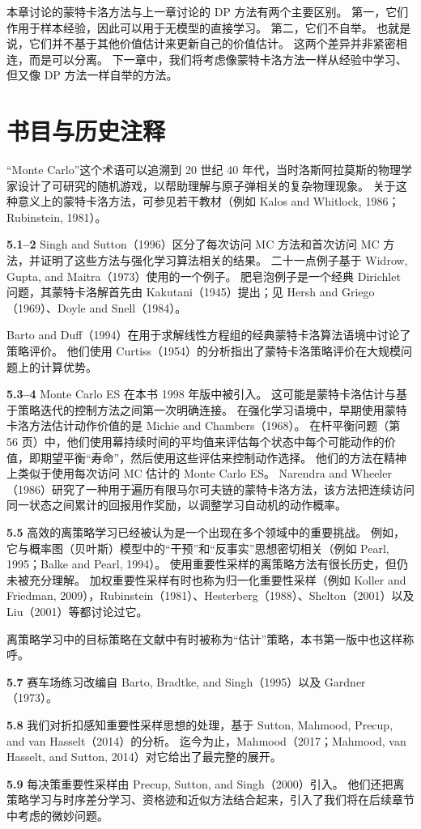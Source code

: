 \documentclass[UTF8, 12pt, fontset=fandol, oneside]{ctexart}
\begin{document}
本章讨论的蒙特卡洛方法与上一章讨论的 DP 方法有两个主要区别。
第一，它们作用于样本经验，因此可以用于无模型的直接学习。
第二，它们不自举。
也就是说，它们并不基于其他价值估计来更新自己的价值估计。
这两个差异并非紧密相连，而是可以分离。
下一章中，我们将考虑像蒙特卡洛方法一样从经验中学习、但又像 DP 方法一样自举的方法。

\section*{书目与历史注释}

“Monte Carlo”这个术语可以追溯到 20 世纪 40 年代，当时洛斯阿拉莫斯的物理学家设计了可研究的随机游戏，以帮助理解与原子弹相关的复杂物理现象。
关于这种意义上的蒙特卡洛方法，可参见若干教材（例如 Kalos and Whitlock, 1986；Rubinstein, 1981）。

\noindent\textbf{5.1--2}
Singh and Sutton（1996）区分了每次访问 MC 方法和首次访问 MC 方法，并证明了这些方法与强化学习算法相关的结果。
二十一点例子基于 Widrow, Gupta, and Maitra（1973）使用的一个例子。
肥皂泡例子是一个经典 Dirichlet 问题，其蒙特卡洛解首先由 Kakutani（1945）提出；见 Hersh and Griego（1969）、Doyle and Snell（1984）。

Barto and Duff（1994）在用于求解线性方程组的经典蒙特卡洛算法语境中讨论了策略评价。
他们使用 Curtiss（1954）的分析指出了蒙特卡洛策略评价在大规模问题上的计算优势。

\noindent\textbf{5.3--4}
Monte Carlo ES 在本书 1998 年版中被引入。
这可能是蒙特卡洛估计与基于策略迭代的控制方法之间第一次明确连接。
在强化学习语境中，早期使用蒙特卡洛方法估计动作价值的是 Michie and Chambers（1968）。
在杆平衡问题（第 56 页）中，他们使用幕持续时间的平均值来评估每个状态中每个可能动作的价值，即期望平衡“寿命”，然后使用这些评估来控制动作选择。
他们的方法在精神上类似于使用每次访问 MC 估计的 Monte Carlo ES。
Narendra and Wheeler（1986）研究了一种用于遍历有限马尔可夫链的蒙特卡洛方法，该方法把连续访问同一状态之间累计的回报用作奖励，以调整学习自动机的动作概率。

\noindent\textbf{5.5}
高效的离策略学习已经被认为是一个出现在多个领域中的重要挑战。
例如，它与概率图（贝叶斯）模型中的“干预”和“反事实”思想密切相关（例如 Pearl, 1995；Balke and Pearl, 1994）。
使用重要性采样的离策略方法有很长历史，但仍未被充分理解。
加权重要性采样有时也称为归一化重要性采样（例如 Koller and Friedman, 2009），Rubinstein（1981）、Hesterberg（1988）、Shelton（2001）以及 Liu（2001）等都讨论过它。

离策略学习中的目标策略在文献中有时被称为“估计”策略，本书第一版中也这样称呼。

\noindent\textbf{5.7}
赛车场练习改编自 Barto, Bradtke, and Singh（1995）以及 Gardner（1973）。

\noindent\textbf{5.8}
我们对折扣感知重要性采样思想的处理，基于 Sutton, Mahmood, Precup, and van Hasselt（2014）的分析。
迄今为止，Mahmood（2017；Mahmood, van Hasselt, and Sutton, 2014）对它给出了最完整的展开。

\noindent\textbf{5.9}
每决策重要性采样由 Precup, Sutton, and Singh（2000）引入。
他们还把离策略学习与时序差分学习、资格迹和近似方法结合起来，引入了我们将在后续章节中考虑的微妙问题。
\end{document}
